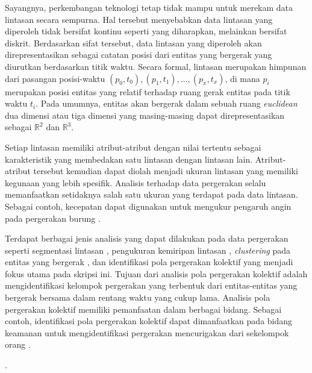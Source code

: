 Sayangnya, perkembangan teknologi tetap tidak mampu untuk merekam data lintasan secara sempurna. Hal tersebut menyebabkan data lintasan yang diperoleh tidak bersifat kontinu seperti yang diharapkan, melainkan bersifat diskrit. Berdasarkan sifat tersebut, data lintasan yang diperoleh akan direpresentasikan sebagai catatan posisi dari entitas yang bergerak yang diurutkan berdasarkan titik waktu. Secara formal, lintasan merupakan himpunan dari pasangan posisi-waktu $(p_0, t_0), (p_1, t_1), \ldots, (p_x, t_x)$, di mana $p_i$ merupakan posisi entitas yang relatif terhadap ruang gerak entitas pada titik waktu $t_i$. Pada umumnya, entitas akan bergerak dalam sebuah ruang \textit{euclidean} dua dimensi atau tiga dimensi yang masing-masing dapat direpresentasikan sebagai 
$\mathbb{R}^2$ dan $\mathbb{R}^3$. \iffalse \lionov{disebut di sini bahwa ruang gerak biasanya R2 atau R3}. \fi

Setiap lintasan memiliki atribut-atribut dengan nilai tertentu sebagai karakteristik yang membedakan satu lintasan dengan lintasan lain. Atribut-atribut tersebut kemudian dapat diolah menjadi ukuran lintasan yang memiliki kegunaan yang lebih spesifik. Analisis terhadap data pergerakan selalu memanfaatkan setidaknya salah satu ukuran yang terdapat pada data lintasan. Sebagai contoh, kecepatan dapat digunakan untuk mengukur pengaruh angin pada pergerakan burung \cite{safi:speed}.

\iffalse \lionov{jadiin paragraf baru, kan ini beda topik} \fi

Terdapat berbagai jenis analisis yang dapat dilakukan pada data pergerakan seperti segmentasi lintasan \cite{mann:01:segmentation}, pengukuran kemiripan lintasan \cite{rote:01:hausdorff, alt:01:frechet, muller:dtw}, \textit{clustering} pada entitas yang bergerak \cite{lee:01:clustering}, dan identifikasi pola pergerakan kolektif yang menjadi fokus utama pada skripsi ini. Tujuan dari analisis pola pergerakan kolektif adalah mengidentifikasi kelompok pergerakan yang terbentuk dari entitas-entitas yang bergerak bersama dalam rentang waktu yang cukup lama. Analisis pola pergerakan kolektif memiliki pemanfaatan dalam berbagai bidang. Sebagai contoh, identifikasi pola pergerakan kolektif dapat dimanfaatkan pada bidang keamanan untuk mengidentifikasi pergerakan mencurigakan dari sekelompok orang \cite{makris:01:security}.

\iffalse 

 .

